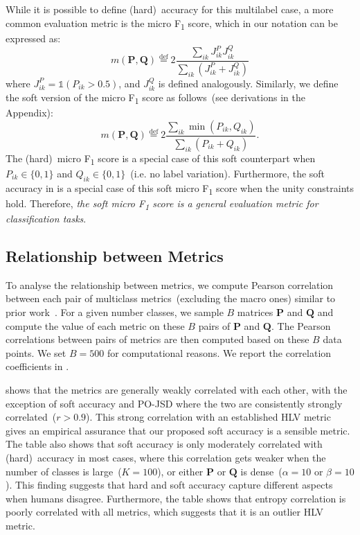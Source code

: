 \documentclass[shortpaper]{clv2025}
\newcommand{\pojsd}{PO-JSD\xspace}
\newcommand{\eqdef}{\overset{\mathrm{def}}{=}}  %
\begin{document}
While it is possible to define (hard)~accuracy for this multilabel case, a more
common evaluation metric is the micro F\textsubscript{1} score, which in our
notation can be expressed as:
\begin{equation*}
  m(\mathbf{P},\mathbf{Q})\eqdef2\frac{\sum_{ik}J^P_{ik}J^Q_{ik}}{\sum_{ik}\left(J^P_{ik}+J^Q_{ik} \right)}
\end{equation*}
where $J^P_{ik}=\mathds{1}(P_{ik}>0.5)$, and $J^Q_{ik}$ is defined analogously.
Similarly, we define the soft version of the micro F\textsubscript{1} score as
follows~(see derivations in the Appendix):
\begin{equation*}
  m(\mathbf{P},\mathbf{Q})\eqdef2\frac{\sum_{ik}\min(P_{ik},Q_{ik})}{\sum_{ik}(P_{ik}+Q_{ik})}.
\end{equation*}
The (hard)~micro
F\textsubscript{1} score is a special case of this soft counterpart when
$P_{ik}\in\{0,1\}$ and $Q_{ik}\in\{0,1\}$~(i.e. no label variation).
Furthermore, the soft accuracy in  is a special case of this
soft micro F\textsubscript{1} score when the unity constraints hold. Therefore,
\emph{the soft micro F\textsubscript{1} score is a general evaluation metric for
  classification tasks}.

\subsection{Relationship between Metrics}\label{sec:rel-overall-metrics}

To analyse the relationship between metrics, we compute Pearson correlation
between each pair of multiclass metrics~(excluding the macro ones) similar to
prior work~\citep{chicco2020}. For a given number classes, we sample $B$
matrices $\mathbf{P}$ and $\mathbf{Q}$ and compute the value of each metric on
these $B$ pairs of $\mathbf{P}$ and $\mathbf{Q}$. The Pearson correlations
between pairs of metrics are then computed based on these $B$ data points. We
set $B=500$ for computational reasons. We report the correlation coefficients in
.

 shows that the metrics are generally weakly correlated
with each other, with the exception of soft accuracy and \pojsd where the two
are consistently strongly correlated~($r>0.9$). This strong correlation with an
established HLV metric gives an empirical assurance that our proposed soft
accuracy is a sensible metric. The table also shows that soft accuracy is only
moderately correlated with (hard)~accuracy in most cases, where this correlation
gets weaker when the number of classes is large~($K=100$), or either
$\mathbf{P}$ or $\mathbf{Q}$ is dense~($\alpha=10$ or $\beta=10$). This finding
suggests that hard and soft accuracy capture different aspects when humans
disagree. Furthermore, the table shows that entropy correlation is poorly
correlated with all metrics, which suggests that it is an outlier HLV metric.
\end{document}

